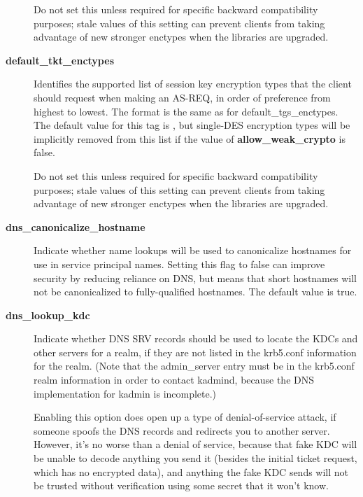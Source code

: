 \documentclass[letterpaper,10pt,english]{sphinxmanual}
\begin{document}
\begin{description}
Do not set this unless required for specific backward
compatibility purposes; stale values of this setting can prevent
clients from taking advantage of new stronger enctypes when the
libraries are upgraded.

\item[{\textbf{default\_tkt\_enctypes}}] \leavevmode
Identifies the supported list of session key encryption types that
the client should request when making an AS-REQ, in order of
preference from highest to lowest.  The format is the same as for
default\_tgs\_enctypes.  The default value for this tag is
, but single-DES encryption types will be implicitly
removed from this list if the value of \textbf{allow\_weak\_crypto} is
false.

Do not set this unless required for specific backward
compatibility purposes; stale values of this setting can prevent
clients from taking advantage of new stronger enctypes when the
libraries are upgraded.

\item[{\textbf{dns\_canonicalize\_hostname}}] \leavevmode
Indicate whether name lookups will be used to canonicalize
hostnames for use in service principal names.  Setting this flag
to false can improve security by reducing reliance on DNS, but
means that short hostnames will not be canonicalized to
fully-qualified hostnames.  The default value is true.

\item[{\textbf{dns\_lookup\_kdc}}] \leavevmode
Indicate whether DNS SRV records should be used to locate the KDCs
and other servers for a realm, if they are not listed in the
krb5.conf information for the realm.  (Note that the admin\_server
entry must be in the krb5.conf realm information in order to
contact kadmind, because the DNS implementation for kadmin is
incomplete.)

Enabling this option does open up a type of denial-of-service
attack, if someone spoofs the DNS records and redirects you to
another server.  However, it's no worse than a denial of service,
because that fake KDC will be unable to decode anything you send
it (besides the initial ticket request, which has no encrypted
data), and anything the fake KDC sends will not be trusted without
verification using some secret that it won't know.


\end{description}
\end{document}
